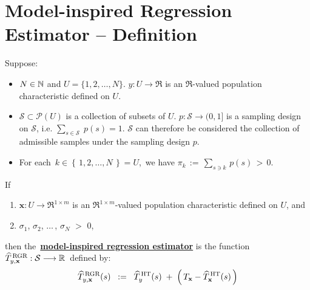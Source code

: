 

\section{Model-inspired Regression Estimator -- Definition}
\setcounter{theorem}{0}
\setcounter{equation}{0}


\renewcommand{\theenumi}{\roman{enumi}}
\renewcommand{\labelenumi}{\textnormal{(\theenumi)}$\;\;$}


\begin{definition}
\mbox{}
\vskip 0.15cm
\noindent
Suppose:
\begin{itemize}
\item
	$N \in \N$ and $U = \{1,2,\ldots,N\}$.
	\vskip 0.05cm
	$y : U \longrightarrow \Re$ is an $\Re$-valued population characteristic defined on $U$.
\item
	$\mathcal{S} \subset \mathcal{P}(U)$ is a collection of subsets of $U$.
	$p : \mathcal{S} \longrightarrow (0,1]$ is a sampling design on $\mathcal{S}$,
	i.e. $\underset{s\in\mathcal{S}}{\sum}\;p(s) = 1$.
	\vskip 0.05cm
	$\mathcal{S}$ can therefore be considered the collection of admissible samples under the sampling design $p$.
\item
	For each \,$k \in \left\{\,1,2,\ldots,N\,\right\} = U$,\, we have
	$\pi_{k} \,:=\, \underset{s \ni k}{\sum}\,p(s) \,>\, 0$.
\end{itemize}
If
\begin{enumerate}
\item
	$\mathbf{x} : U \longrightarrow \Re^{1 \times m}$ is an $\Re^{1 \times m}$-valued
	population characteristic defined on $U$, and
\item
	$\sigma_{1}$, $\sigma_{2}$, $\ldots$\,, $\sigma_{N}$ $>$ $0$,
\end{enumerate}
then the \,\underline{\textbf{model-inspired regression estimator}}\; is the function
\,$\widehat{T}^{\,\textnormal{RGR}}_{y,\mathbf{x}} : \mathcal{S} \longrightarrow \Re$\,
defined by:
\begin{equation*}
\widehat{T}^{\,\textnormal{RGR}}_{y,\mathbf{x}}(s)
\;\; := \;\;
	\widehat{T}^{\,\textnormal{HT}}_{y}(s)
	\; + \;
	\left(\,T_{\mathbf{x}} - \widehat{T}^{\,\textnormal{HT}}_{\mathbf{x}}(s) \,\right)

\end{equation*}
\end{definition}
